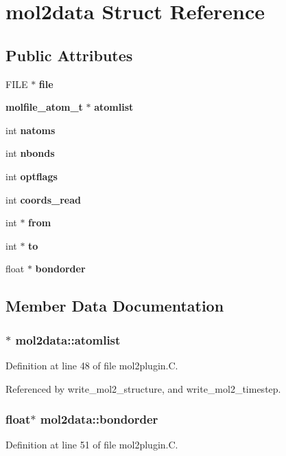 \section{mol2data  Struct Reference}
\label{structmol2data}
\subsection*{Public Attributes}
\begin{CompactItemize}
\item 
FILE $\ast$ {\bf file}
\item 
{\bf molfile\_\-atom\_\-t} $\ast$ {\bf atomlist}
\item 
int {\bf natoms}
\item 
int {\bf nbonds}
\item 
int {\bf optflags}
\item 
int {\bf coords\_\-read}
\item 
int $\ast$ {\bf from}
\item 
int $\ast$ {\bf to}
\item 
float $\ast$ {\bf bondorder}
\end{CompactItemize}


\subsection{Member Data Documentation}
\subsubsection{$\ast$ mol2data::atomlist}\label{structmol2data_m1}




Definition at line 48 of file mol2plugin.C.

Referenced by write\_\-mol2\_\-structure, and write\_\-mol2\_\-timestep.
\subsubsection{\setlength{\rightskip}{0pt plus 5cm}float$\ast$ mol2data::bondorder}\label{structmol2data_m8}




Definition at line 51 of file mol2plugin.C.

